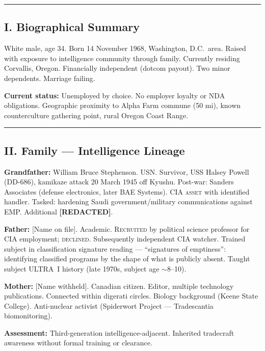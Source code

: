 \vspace{1cm}\hrule\vspace{1cm}

\subsection*{I. Biographical Summary}
\label{record:tgt-biographical-summary}

White male, age 34. Born 14 November 1968, Washington, D.C.\ area. Raised with exposure to intelligence community through family. Currently residing Corvallis, Oregon. Financially independent (dotcom payout). Two minor dependents. Marriage failing.

\textbf{Current status:} Unemployed by choice. No employer loyalty or NDA obligations. Geographic proximity to Alpha Farm commune (50 mi), known counterculture gathering point, rural Oregon Coast Range.

\vspace{1cm}\hrule\vspace{1cm}

\subsection*{II. Family --- Intelligence Lineage}
\label{record:tgt-family-intelligence-lineage}

\textbf{Grandfather:} William Bruce Stephenson. USN. Survivor, USS Halsey Powell (DD-686), kamikaze attack 20 March 1945 off Kyushu. Post-war: Sanders Associates (defense electronics, later BAE Systems). CIA \textsc{asset} with identified handler. Tasked: hardening Saudi government/military communications against EMP. Additional \textbf{[REDACTED]}.

\textbf{Father:} [Name on file]. Academic. \textsc{Recruited} by political science professor for CIA employment; \textsc{declined}. Subsequently independent CIA watcher. Trained subject in classification signature reading --- ``signatures of emptiness'': identifying classified programs by the shape of what is publicly absent. Taught subject ULTRA~I history (late 1970s, subject age $\sim$8--10).

\textbf{Mother:} [Name withheld]. Canadian citizen. Editor, multiple technology publications. Connected within digerati circles. Biology background (Keene State College). Anti-nuclear activist (Spiderwort Project --- Tradescantia biomonitoring).

\textbf{Assessment:} Third-generation intelligence-adjacent. Inherited tradecraft awareness without formal training or clearance.

